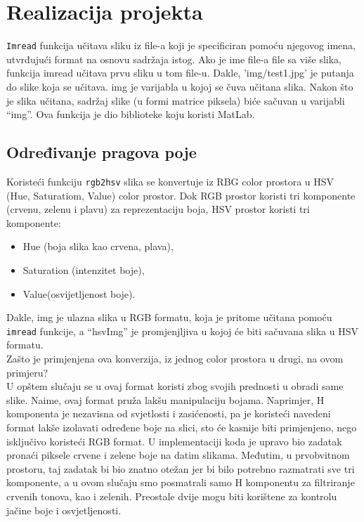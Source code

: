 \documentclass[a4paper,12pt]{article}
\begin{document}
\section{Realizacija projekta}

\texttt{Imread} funkcija učitava sliku iz file-a koji je specificiran pomoću njegovog imena, utvrđujući format  na osnovu sadržaja istog. 
Ako je ime file-a file sa više slika, funkcija imread učitava prvu sliku u tom file-u.
Dakle, 'img/test1.jpg' je putanja do slike koja se učitava. img je varijabla u kojoj se čuva učitana slika. 
Nakon što je slika učitana, sadržaj slike (u formi matrice piksela) biće sačuvan u varijabli “img”. Ova funkcija je dio biblioteke koju koristi MatLab.\\
\subsection{Određivanje pragova poje}


Koristeći funkciju \texttt{rgb2hsv} slika se konvertuje iz RBG color prostora u HSV (Hue, Saturatiom, Value) color prostor. 
Dok RGB prostor koristi tri komponente (crvenu, zelenu i plavu) za reprezentaciju boja, HSV prostor koristi tri komponente:\\
\begin{itemize}
    \item Hue (boja slika kao crvena, plava),
    \item Saturation (intenzitet boje),
    \item Value(osvijetljenost boje).
\end{itemize}

Dakle, img je ulazna slika u RGB formatu, koja je pritome učitana pomoću \texttt {imread} funkcije, a “hsvImg” je promjenjljiva u kojoj će biti sačuvana slika u HSV formatu. \\

\indent Zašto je primjenjena ova konverzija, iz jednog color prostora u drugi, na ovom primjeru?\\

U opštem slučaju se u ovaj format koristi zbog svojih prednosti u obradi same slike. 
Naime, ovaj format pruža lakšu manipulaciju bojama. 
Naprimjer, H komponenta je nezavisna od svjetlosti i zasićenosti, pa je koristeći navedeni format lakše izolavati određene boje na slici, sto će kasnije biti primjenjeno, nego isključivo koristeći RGB format. 
U implementaciji koda je upravo bio zadatak pronaći piksele crvene i zelene boje na datim slikama. 
Međutim, u prvobvitnom prostoru, taj zadatak bi bio znatno otežan jer bi bilo potrebno razmatrati sve tri komponente, a u ovom slučaju smo posmatrali samo H komponentu za filtriranje crvenih tonova, kao i zelenih. 
Preostale dvije mogu biti korištene za kontrolu jačine boje i osvjetljenosti. 
\end{document}
